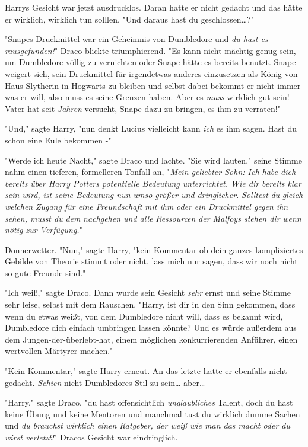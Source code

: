 {Harrys Gesicht war jetzt ausdrucklos. Daran hatte er nicht gedacht und das hätte er wirklich, wirklich tun solllen. "Und daraus hast du geschlossen…?"

"Snapes Druckmittel war ein Geheimnis von Dumbledore und \emph{du hast es rausgefunden!}" Draco blickte triumphierend. "Es kann nicht mächtig genug sein, um Dumbledore völlig zu vernichten oder Snape hätte es bereits benutzt. Snape weigert sich, sein Druckmittel für irgendetwas anderes einzusetzen als König von Haus Slytherin in Hogwarts zu bleiben und selbst dabei bekommt er nicht immer was er will, also muss es seine Grenzen haben. Aber es \emph{muss} wirklich gut sein! Vater hat seit \emph{Jahren} versucht, Snape dazu zu bringen, es ihm zu verraten!"

"Und," sagte Harry, "nun denkt Lucius vielleicht kann \emph{ich} es ihm sagen. Hast du schon eine Eule bekommen -"

"Werde ich heute Nacht," sagte Draco und lachte. "Sie wird lauten," seine Stimme nahm einen tieferen, formelleren Tonfall an, "\emph{Mein geliebter Sohn: Ich habe dich} \emph{bereits} \emph{über Harry Potters potentielle Bedeutung unterrichtet. Wie dir bereits klar} \emph{sein wird, ist seine Bedeutung nun umso größer und dringlicher.} \emph{Solltest} \emph{du} \emph{gleich welchen} \emph{Zugang für eine Freundschaft} \emph{mit ihm} \emph{oder} \emph{ein} \emph{Druckmittel gegen ihn sehen, musst du} \emph{dem} \emph{nachgehen und alle} \emph{Ressourcen} \emph{der Malfoys stehen dir} \emph{wenn} \emph{nötig zur Verfügung.}"

Donnerwetter. "Nun," sagte Harry, "kein Kommentar ob dein ganzes kompliziertes Gebilde von Theorie stimmt oder nicht, lass mich nur sagen, dass wir noch nicht so gute Freunde sind."

"Ich weiß," sagte Draco. Dann wurde sein Gesicht \emph{sehr} ernst und seine Stimme sehr leise, selbst mit dem Rauschen. "Harry, ist dir in den Sinn gekommen, dass wenn du etwas weißt, von dem Dumbledore nicht will, dass es bekannt wird, Dumbledore dich einfach umbringen lassen könnte? Und es würde außerdem aus dem Jungen-der-überlebt-hat, einem möglichen konkurrierenden Anführer, einen wertvollen Märtyrer machen."

"Kein Kommentar," sagte Harry erneut. An das letzte hatte er ebenfalls nicht gedacht. \emph{Schien} nicht Dumbledores Stil zu sein… aber…

"Harry," sagte Draco, "du hast offensichtlich \emph{unglaubliches} Talent, doch du hast keine Übung und keine Mentoren und manchmal tust du wirklich dumme Sachen und \emph{du brauchst wirklich einen Ratgeber, der weiß wie man das macht oder du wirst verletzt!}" Dracos Gesicht war eindringlich.

}
